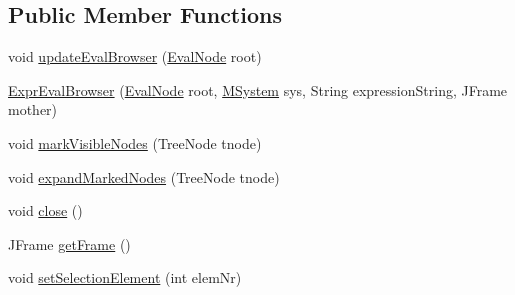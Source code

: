 \subsection*{Public Member Functions}
\begin{DoxyCompactItemize}
\item 
void \hyperlink{classorg_1_1tzi_1_1use_1_1gui_1_1views_1_1evalbrowser_1_1_expr_eval_browser_afa213769921305f7f69700a635da9530}{update\-Eval\-Browser} (\hyperlink{classorg_1_1tzi_1_1use_1_1uml_1_1ocl_1_1expr_1_1_eval_node}{Eval\-Node} root)
\item 
\hyperlink{classorg_1_1tzi_1_1use_1_1gui_1_1views_1_1evalbrowser_1_1_expr_eval_browser_a8fbb66d38341c46c0155d8e9ff6176d6}{Expr\-Eval\-Browser} (\hyperlink{classorg_1_1tzi_1_1use_1_1uml_1_1ocl_1_1expr_1_1_eval_node}{Eval\-Node} root, \hyperlink{classorg_1_1tzi_1_1use_1_1uml_1_1sys_1_1_m_system}{M\-System} sys, String expression\-String, J\-Frame mother)
\item 
void \hyperlink{classorg_1_1tzi_1_1use_1_1gui_1_1views_1_1evalbrowser_1_1_expr_eval_browser_ab54b12b6befee3abe2a1b58e403ffcba}{mark\-Visible\-Nodes} (Tree\-Node tnode)
\item 
void \hyperlink{classorg_1_1tzi_1_1use_1_1gui_1_1views_1_1evalbrowser_1_1_expr_eval_browser_a2ce6c45e0fe81fae463eb13b786369e7}{expand\-Marked\-Nodes} (Tree\-Node tnode)
\item 
void \hyperlink{classorg_1_1tzi_1_1use_1_1gui_1_1views_1_1evalbrowser_1_1_expr_eval_browser_a283ba39f60b3da87cfbdc0e40372c3e4}{close} ()
\item 
J\-Frame \hyperlink{classorg_1_1tzi_1_1use_1_1gui_1_1views_1_1evalbrowser_1_1_expr_eval_browser_aafe3f3d8dbf9d433b9d63603bbd2b402}{get\-Frame} ()
\item 
void \hyperlink{classorg_1_1tzi_1_1use_1_1gui_1_1views_1_1evalbrowser_1_1_expr_eval_browser_afd9598930f5843a6ece4fdaecf609d7c}{set\-Selection\-Element} (int elem\-Nr)
\end{DoxyCompactItemize}
